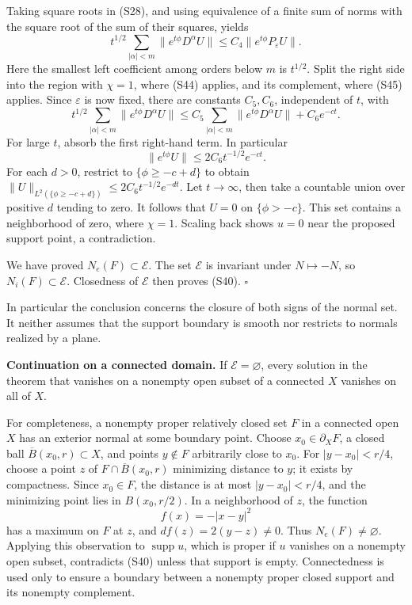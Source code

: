\documentclass[
  11pt,
]{article}
\begin{document}
Taking square roots in (S28), and using equivalence of a finite sum of
norms with the square root of the sum of their squares, yields \[
 t^{1/2}\sum_{|\alpha|<m}\|e^{t\phi}D^\alpha U\|
       \leq C_4\|e^{t\phi}P_\varepsilon U\|.
\] Here the smallest left coefficient among orders below \(m\) is
\(t^{1/2}\). Split the right side into the region with \(\chi=1\), where
(S44) applies, and its complement, where (S45) applies. Since
\(\varepsilon\) is now fixed, there are constants \(C_5,C_6\),
independent of \(t\), with \[
 t^{1/2}\sum_{|\alpha|<m}\|e^{t\phi}D^\alpha U\|
 \leq C_5\sum_{|\alpha|<m}\|e^{t\phi}D^\alpha U\|
                                      +C_6e^{-ct}.              \tag{S46}
\] For large \(t\), absorb the first right-hand term. In particular \[
                  \|e^{t\phi}U\|\leq 2C_6t^{-1/2}e^{-ct}.       \tag{S47}
\] For each \(d>0\), restrict to \(\{\phi\geq-c+d\}\) to obtain
\(\|U\|_{L^2(\{\phi\geq-c+d\})}\leq2C_6t^{-1/2}e^{-dt}\). Let
\(t\to\infty\), then take a countable union over positive \(d\) tending
to zero. It follows that \(U=0\) on \(\{\phi>-c\}\). This set contains a
neighborhood of zero, where \(\chi=1\). Scaling back shows \(u=0\) near
the proposed support point, a contradiction.

We have proved \(N_e(F)\subset\mathcal E\). The set \(\mathcal E\) is
invariant under \(N\mapsto-N\), so \(N_i(F)\subset\mathcal E\).
Closedness of \(\mathcal E\) then proves (S40). \(\square\)

In particular the conclusion concerns the closure of both signs of the
normal set. It neither assumes that the support boundary is smooth nor
restricts to normals realized by a plane.

\textbf{Continuation on a connected domain.} If
\(\mathcal E=\varnothing\), every solution in the theorem that vanishes
on a nonempty open subset of a connected \(X\) vanishes on all of \(X\).

For completeness, a nonempty proper relatively closed set \(F\) in a
connected open \(X\) has an exterior normal at some boundary point.
Choose \(x_0\in\partial_XF\), a closed ball
\(\overline B(x_0,r)\subset X\), and points \(y\notin F\) arbitrarily
close to \(x_0\). For \(|y-x_0|<r/4\), choose a point \(z\) of
\(F\cap\overline B(x_0,r)\) minimizing distance to \(y\); it exists by
compactness. Since \(x_0\in F\), the distance is at most
\(|y-x_0|<r/4\), and the minimizing point lies in \(B(x_0,r/2)\). In a
neighborhood of \(z\), the function \[
                         f(x)=-|x-y|^2
\] has a maximum on \(F\) at \(z\), and \(df(z)=2(y-z)\ne0\). Thus
\(N_e(F)\ne\varnothing\). Applying this observation to
\(\operatorname{supp}u\), which is proper if \(u\) vanishes on a
nonempty open subset, contradicts (S40) unless that support is empty.
Connectedness is used only to ensure a boundary between a nonempty
proper closed support and its nonempty complement.
\end{document}
